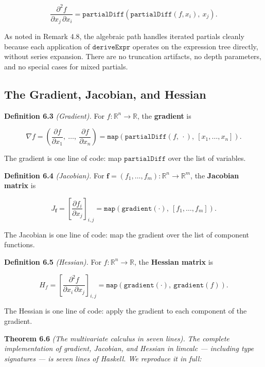 \documentclass[12pt]{article}
\begin{document}
\[\frac{\partial^2 f}{\partial x_j \, \partial x_i} = \mathtt{partialDiff}(\mathtt{partialDiff}(f, x_i),\ x_j).\]

As noted in Remark 4.8, the algebraic path handles iterated partials
cleanly because each application of \(\mathtt{deriveExpr}\) operates on
the expression tree directly, without series expansion. There are no
truncation artifacts, no depth parameters, and no special cases for
mixed partials.




\subsection{The Gradient, Jacobian, and
Hessian}\label{the-gradient-jacobian-and-hessian}

\textbf{Definition 6.3} \emph{(Gradient).} For
\(f : \mathbb{R}^n \to \mathbb{R}\), the \textbf{gradient} is

\[\nabla f = \left(\frac{\partial f}{\partial x_1},\ \ldots,\ \frac{\partial f}{\partial x_n}\right) = \mathtt{map}(\mathtt{partialDiff}(f,\ \cdot),\ [x_1, \ldots, x_n]).\]

The gradient is one line of code: map \(\mathtt{partialDiff}\) over the
list of variables.

\textbf{Definition 6.4} \emph{(Jacobian).} For
\(\mathbf{f} = (f_1, \ldots, f_m) : \mathbb{R}^n \to \mathbb{R}^m\), the
\textbf{Jacobian matrix} is

\[J_{\mathbf{f}} = \left[\frac{\partial f_i}{\partial x_j}\right]_{i,j} = \mathtt{map}(\mathtt{gradient}(\cdot),\ [f_1, \ldots, f_m]).\]

The Jacobian is one line of code: map the gradient over the list of
component functions.

\textbf{Definition 6.5} \emph{(Hessian).} For
\(f : \mathbb{R}^n \to \mathbb{R}\), the \textbf{Hessian matrix} is

\[H_f = \left[\frac{\partial^2 f}{\partial x_i \, \partial x_j}\right]_{i,j} = \mathtt{map}(\mathtt{gradient}(\cdot),\ \mathtt{gradient}(f)).\]

The Hessian is one line of code: apply the gradient to each component of
the gradient.

\textbf{Theorem 6.6} \emph{(The multivariate calculus in seven lines).}
\emph{The complete implementation of gradient, Jacobian, and Hessian in
limcalc --- including type signatures --- is seven lines of Haskell. We
reproduce it in full:}
\end{document}
